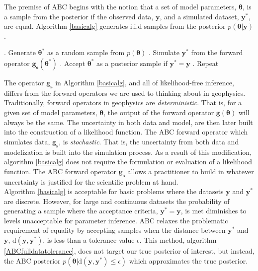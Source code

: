 The premise of ABC begins with the notion that a set of model parameters, $\bm{\theta}$, is a sample from the posterior if the observed data, $\bm{y}$, and a simulated dataset, $\bm{y^*}$, are equal. Algorithm \ref{basicalg} generates i.i.d samples from the posterior $p(\bm{\theta}|\bm{y})$.

\begin{algorithm}[H]
	\caption{ }
	\begin{algorithmic}
		. Generate $\bm{\theta^*}$ as a random sample from $p(\bm{\theta})$		
		. Simulate $\bm{y^*}$ from the forward operator $\bm{g_s}(\bm{\theta^*})$		
		. Accept $\bm{\theta^*}$ as a posterior sample if $\bm{y^*} = \bm{y}$		
		. Repeat
	\end{algorithmic}
	\label{basicalg}
\end{algorithm}

The operator $\bm{g_s}$ in Algorithm \ref{basicalg}, and all of likelihood-free inference, differs from the forward operators we are used to thinking about in geophysics. Traditionally, forward operators in geophysics are \textit{deterministic}. That is, for a given set of model parameters, $\bm{\theta}$, the output of the forward operator $\bm{g}(\bm{\theta})$ will always be the same. The uncertainty in both data and model, are then later built into the construction of a likelihood function. The ABC forward operator which simulates data, $\bm{g_s}$, is \textit{stochastic}. That is, the uncertainty from both data and modelization is built into the simulation process. As a result of this modification, algorithm \ref{basicalg} does not require the formulation or evaluation of a likelihood function. The ABC forward operator $\bm{g_s}$ allows a practitioner to build in whatever uncertainty is justified for the scientific problem at hand.\\

Algorithm \ref{basicalg} is acceptable for basic problems where the datasets $\bm{y}$ and $\bm{y^*}$ are discrete. However, for large and continuous datasets the probability of generating a sample where the acceptance criteria, $\bm{y^*} = \bm{y}$, is met diminishes to levels unacceptable for parameter inference. ABC relaxes the problematic requirement of equality by accepting samples when the distance between $\bm{y^*}$ and $\bm{y}$, $\text{d}(\bm{y},\bm{y^*})$, is less than a tolerance value $\epsilon$. This method, algorithm \ref{ABCfulldatatolerance}, does not target our true posterior of interest, but instead, the ABC posterior $p(\bm{\theta}|\text{d}(\bm{y},\bm{y^*})\leq\epsilon)$ which approximates the true posterior. 

